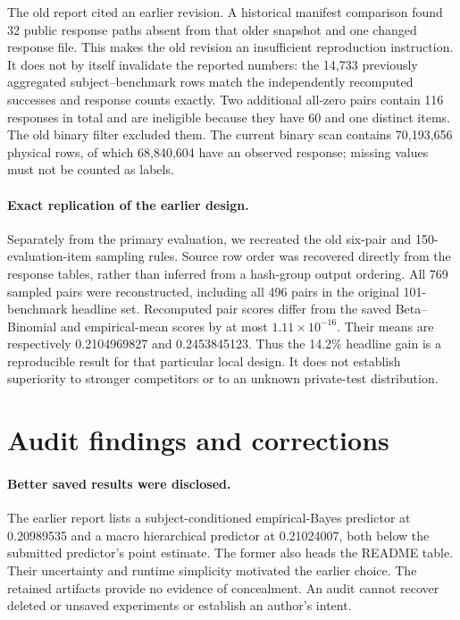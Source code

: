 \documentclass{article}
\begin{document}
The old report cited an earlier revision. A historical manifest comparison
found 32 public response paths absent from that older snapshot and one changed
response file. This makes the old revision an insufficient reproduction
instruction. It does not by itself invalidate the reported numbers: the
14,733 previously aggregated subject--benchmark rows match the independently
recomputed successes and response counts exactly. Two additional all-zero
pairs contain 116 responses in total and are ineligible because they have
60 and one distinct items. The old binary filter excluded them. The current
binary scan contains 70,193,656 physical rows, of which 68,840,604 have an
observed response; missing values must not be counted as labels.

\paragraph{Exact replication of the earlier design.}
Separately from the primary evaluation, we recreated the old six-pair and
150-evaluation-item sampling rules. Source row order was recovered directly
from the response tables, rather than inferred from a hash-group output
ordering. All 769 sampled pairs were reconstructed, including all 496 pairs
in the original 101-benchmark headline set. Recomputed pair scores differ
from the saved Beta--Binomial and empirical-mean scores by at most
$1.11\times10^{-16}$. Their means are respectively 0.2104969827 and
0.2453845123. Thus the 14.2\% headline gain is a reproducible result for
that particular local design. It does not establish superiority to stronger
competitors or to an unknown private-test distribution.

\section{Audit findings and corrections}
\paragraph{Better saved results were disclosed.}
The earlier report lists a subject-conditioned empirical-Bayes predictor at
0.20989535 and a macro hierarchical predictor at 0.21024007, both below the
submitted predictor's point estimate. The former also heads the README table.
Their uncertainty and runtime simplicity motivated the earlier choice.
The retained artifacts provide no evidence of concealment. An audit cannot
recover deleted or unsaved experiments or establish an author's intent.
\end{document}
